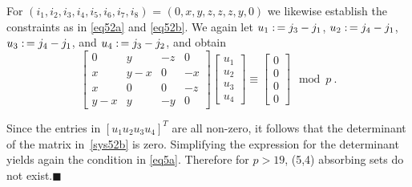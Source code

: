 For $(i_1,i_2,i_3,i_4,i_5,i_6,i_7,i_8)$ = $(0,x,y,z,z,z,y,0)$ we
likewise establish the constraints as in \eqref{eq52a} and
\eqref{eq52b}. We again let $u_1 \asn j_3 -j_1$, $u_2\asn j_4
-j_1$, $u_3 \asn j_4 -j_1$, and $u_4 \asn j_3 -j_2$, and obtain
\begin{equation}\label{sys52b}
\left[ \begin{array}{ccccccc} 0 & y & -z & 0\\
x & y-x & 0 & -x\\
x & 0 &0 & -z\\
y-x & y & -y & 0
\end{array}\right] \left[\begin{array}{c}
u_1\\u_2\\u_3\\u_4 \end{array}\right] \equiv
\left[\begin{array}{c}0\\0\\0\\0\end{array}\right] \mod p~.
\end{equation}

Since the entries in  $\left[u_1 u_2 u_3 u_4\right]^{T}$ are all
non-zero, it follows that the determinant of the matrix
in~\eqref{sys52b} is zero. Simplifying the expression for the
determinant yields again the condition in \eqref{eq5a}. Therefore
for $p>19$, (5,4) absorbing sets do not exist.\hfill$\blacksquare$



